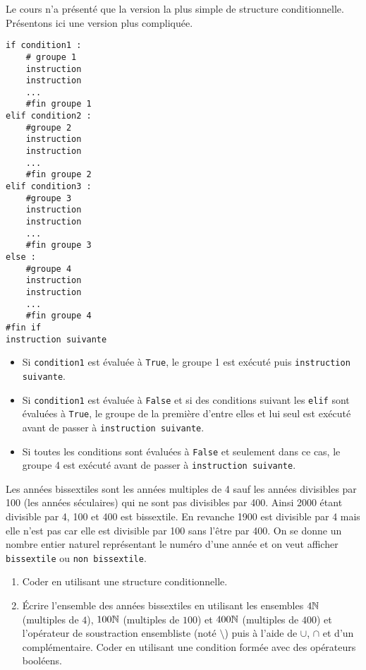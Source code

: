 Le cours n'a présenté que la version la plus simple de structure conditionnelle. Présentons ici une version plus compliquée.
\begin{verbatim}
if condition1 :
    # groupe 1
    instruction
    instruction
    ...
    #fin groupe 1
elif condition2 :
    #groupe 2
    instruction
    instruction
    ...
    #fin groupe 2
elif condition3 :
    #groupe 3
    instruction
    instruction
    ...
    #fin groupe 3
else :
    #groupe 4
    instruction
    instruction
    ...
    #fin groupe 4
#fin if
instruction suivante
\end{verbatim}
\begin{itemize}
 \item Si \texttt{condition1} est évaluée à \texttt{True}, le groupe 1 est exécuté puis \texttt{instruction suivante}.
 \item Si \texttt{condition1} est évaluée à \texttt{False} et si des conditions suivant les \texttt{elif} sont évaluées à \texttt{True}, le groupe de la première d'entre elles et lui seul est exécuté avant de passer à \texttt{instruction suivante}.
 \item Si toutes les conditions sont évaluées à \texttt{False} et seulement dans ce cas, le groupe 4 est exécuté avant de passer à \texttt{instruction suivante}.
\end{itemize}
Les années bissextiles sont les années multiples de 4 sauf les années divisibles par 100 (les années séculaires) qui ne sont pas divisibles par 400. Ainsi 2000 étant divisible par 4, 100 et 400 est bissextile. En revanche 1900 est divisible par 4 mais elle n'est pas car elle est divisible par 100 sans l'être par 400.
On se donne un nombre entier naturel représentant le numéro d'une année et on veut afficher \texttt{bissextile} ou \texttt{non bissextile}.
\begin{enumerate}
 \item Coder en utilisant une structure conditionnelle.
 \item \'Ecrire l'ensemble des années bissextiles en utilisant les ensembles $4\mathbb{N}$ (multiples de $4$), $100\mathbb{N}$ (multiples de $100$) et $400\mathbb{N}$ (multiples de $400$) et l'opérateur de soustraction ensembliste (noté $\setminus$) puis à l'aide de $\cup$, $\cap$ et d'un complémentaire. Coder en utilisant une condition formée avec des opérateurs booléens.
\end{enumerate}

